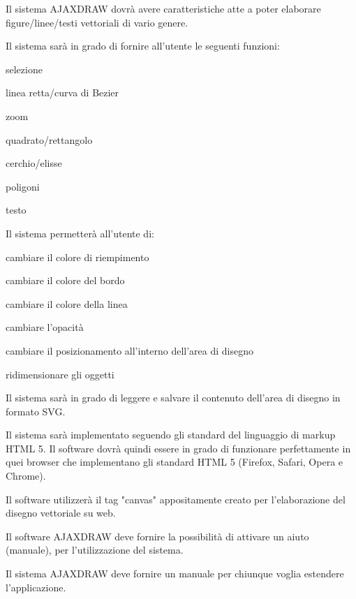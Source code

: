 \newpage


\begin{elenconumerato}{\subsecindent}
\item Il sistema AJAXDRAW dovr\`a avere caratteristiche atte a poter elaborare figure/linee/testi vettoriali di vario genere.
\item Il sistema sar\`a in grado di fornire all'utente le seguenti funzioni:

\begin{list}{-}{}
\item selezione
\item linea retta/curva di Bezier
\item zoom
\item quadrato/rettangolo
\item cerchio/elisse
\item poligoni
\item testo
\end{list}

\item Il sistema permetter\`a all'utente di:

\begin{list}{-}{}
\item cambiare il colore di riempimento
\item cambiare il colore del bordo
\item cambiare il colore della linea
\item cambiare l'opacit\`a
\item cambiare il posizionamento all'interno dell'area di disegno
\item ridimensionare gli oggetti
\end{list}

\item Il sistema sar\`a in grado di leggere e salvare il contenuto dell'area di disegno in formato SVG.
\item Il sistema sar\`a implementato seguendo gli standard del linguaggio di markup HTML 5. Il software dovr\`a quindi essere in grado di funzionare perfettamente in quei browser che implementano gli standard HTML 5 (Firefox, Safari, Opera e Chrome). 
\item Il software utilizzer\`a il tag "canvas" appositamente creato per l'elaborazione del disegno vettoriale su web.
\item Il software AJAXDRAW deve fornire la possibilit\`a di attivare un aiuto (manuale), per l'utilizzazione del sistema. 
\item Il sistema AJAXDRAW deve fornire un manuale per chiunque voglia estendere l'applicazione. 
\end{elenconumerato}

